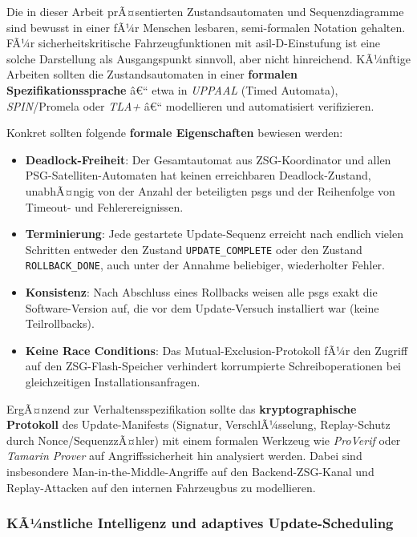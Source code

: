 ﻿\documentclass[12pt,a4paper,twoside]{article}
\begin{document}
Die in dieser Arbeit prÃ¤sentierten Zustandsautomaten und
Sequenzdiagramme sind bewusst in einer fÃ¼r Menschen lesbaren,
semi-formalen Notation gehalten. FÃ¼r sicherheitskritische
Fahrzeugfunktionen mit \gls{asil}-D-Einstufung ist eine solche
Darstellung als Ausgangspunkt sinnvoll, aber nicht hinreichend.
KÃ¼nftige Arbeiten sollten die Zustandsautomaten in einer
\textbf{formalen Spezifikationssprache} â€“ etwa in \textit{UPPAAL}
(Timed Automata), \textit{SPIN}/Promela oder \textit{TLA+} â€“
modellieren und automatisiert verifizieren.

Konkret sollten folgende \textbf{formale Eigenschaften} bewiesen werden:

\begin{itemize}
  \item \textbf{Deadlock-Freiheit}: Der Gesamtautomat aus ZSG-Koordinator
    und allen PSG-Satelliten-Automaten hat keinen erreichbaren
    Deadlock-Zustand, unabhÃ¤ngig von der Anzahl der beteiligten \glspl{psg}
    und der Reihenfolge von Timeout- und Fehlerereignissen.
  \item \textbf{Terminierung}: Jede gestartete Update-Sequenz erreicht
    nach endlich vielen Schritten entweder den Zustand
    \texttt{UPDATE\_COMPLETE} oder den Zustand \texttt{ROLLBACK\_DONE},
    auch unter der Annahme beliebiger, wiederholter Fehler.
  \item \textbf{Konsistenz}: Nach Abschluss eines Rollbacks weisen alle
    \glspl{psg} exakt die Software-Version auf, die vor dem
    Update-Versuch installiert war (keine Teilrollbacks).
  \item \textbf{Keine Race Conditions}: Das Mutual-Exclusion-Protokoll
    fÃ¼r den Zugriff auf den ZSG-Flash-Speicher verhindert korrumpierte
    Schreiboperationen bei gleichzeitigen Installationsanfragen.
\end{itemize}

ErgÃ¤nzend zur Verhaltensspezifikation sollte das
\textbf{kryptographische Protokoll} des Update-Manifests (Signatur,
VerschlÃ¼sselung, Replay-Schutz durch Nonce/SequenzzÃ¤hler) mit einem
formalen Werkzeug wie \textit{ProVerif} oder \textit{Tamarin Prover}
auf Angriffssicherheit hin analysiert werden. Dabei sind insbesondere
Man-in-the-Middle-Angriffe auf den Backend-ZSG-Kanal und
Replay-Attacken auf den internen Fahrzeugbus zu modellieren.

\subsubsection{KÃ¼nstliche Intelligenz und adaptives Update-Scheduling}
\end{document}

